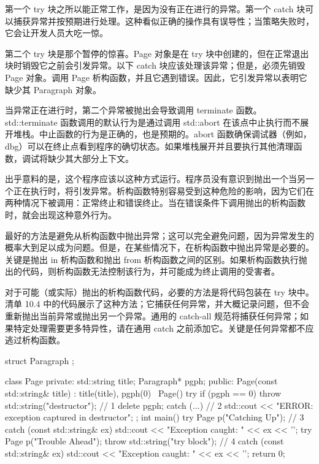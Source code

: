 第一个 try 块之所以能正常工作，是因为没有正在进行的异常。第一个 catch 块可以捕获异常并按预期进行处理。这种看似正确的操作具有误导性；当策略失败时，它会让开发人员大吃一惊。

第二个 try 块是那个暂停的惊喜。Page 对象是在 try 块中创建的，但在正常退出块时销毁它之前会引发异常。以下 catch 块应该处理该异常；但是，必须先销毁 Page 对象。调用 Page 析构函数，并且它遇到错误。因此，它引发异常以表明它缺少其 Paragraph 对象。

当异常正在进行时，第二个异常被抛出会导致调用 terminate 函数。std::terminate 函数调用的默认行为是通过调用 std::abort 在该点中止执行而不展开堆栈。中止函数的行为是正确的，也是预期的。abort 函数确保调试器（例如，dbg）可以在终止点看到程序的确切状态。如果堆栈展开并且要执行其他清理函数，调试将缺少其大部分上下文。

出乎意料的是，这个程序应该以这种方式运行。程序员没有意识到抛出一个当另一个正在执行时，将引发异常。析构函数特别容易受到这种危险的影响，因为它们在两种情况下被调用：正常终止和错误终止。当在错误条件下调用抛出的析构函数时，就会出现这种意外行为。


最好的方法是避免从析构函数中抛出异常；这可以完全避免问题，因为异常发生的概率大到足以成为问题。但是，在某些情况下，在析构函数中抛出异常是必要的。关键是抛出 in 析构函数和抛出 from 析构函数之间的区别。如果析构函数执行抛出的代码，则析构函数无法控制该行为，并可能成为终止调用的受害者。

对于可能（或实际）抛出的析构函数代码，必要的方法是将代码包装在 try 块中。清单 10.4 中的代码展示了这种方法；它捕获任何异常，并大概记录问题，但不会重新抛出当前异常或抛出另一个异常。通用的 catch-all 规范将捕获任何异常；如果特定处理需要更多特异性，请在通用 catch 之前添加它。关键是任何异常都不应逃过析构函数。


\begin{cpp}
struct Paragraph {};

class Page {
private:
  std::string title;
  Paragraph* pgph;
public:
  Page(const std::string& title) : title(title), pgph(0) {}
  ~Page() {
    try {
      if (pgph == 0)
      throw std::string("destructor"); // 1
    delete pgph;
    } catch (...) { // 2
      std::cout << "ERROR: exception captured in destructor\n";
    }
  }
};
int main() {
  try {
    Page p("Catching Up"); // 3
  } catch (const std::string& ex) {
    std::cout << "Exception caught: " << ex << '\n';
  }
  try {
    Page p("Trouble Ahead");
    throw std::string("try block"); // 4
  } catch (const std::string& ex) {
    std::cout << "Exception caught: " << ex << '\n';
  }
  return 0;
}
\end{cpp}

